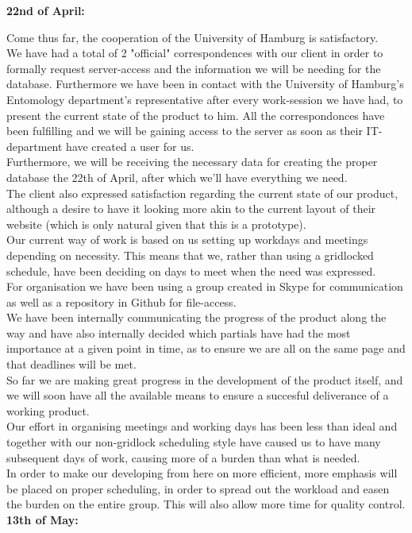 \documentclass[12pt,a4paper]{article}
\begin{document}
{\bf 22nd of April:}

Come thus far, the cooperation of the University of Hamburg is satisfactory.\\
We have had a total of 2 "official" correspondences with our client in order to formally request server-access and the information we will be needing for the database. Furthermore we have been in contact with the University of Hamburg's Entomology department's representative after every work-session we have had, to present the current state of the product to him.
All the correspondonces have been fulfilling and we will be gaining access to the server as soon as their IT-department have created a user for us.\\ Furthermore, we will be receiving the necessary data for creating the proper database the 22th of April, after which we'll have everything we need. \\
The client also expressed satisfaction regarding the current state of our product, although a desire to have it looking more akin to the current layout of their website (which is only natural given that this is a prototype).\\
Our current way of work is based on us setting up workdays and meetings depending on necessity. This means that we, rather than using a gridlocked schedule, have been deciding on days to meet when the need was expressed.\\
For organisation we have been using a group created in Skype for communication as well as a repository in Github for file-access. \\
We have been internally communicating the progress of the product along the way and have also internally decided which partials have had the most importance at a given point in time, as to ensure we are all on the same page and that deadlines will be met.\\

So far we are making great progress in the development of the product itself, and we will soon have all the available means to ensure a succesful deliverance of a working product.\\
Our effort in organising meetings and working days has been less than ideal and together with our non-gridlock scheduling style have caused us to have many subsequent days of work, causing more of a burden than what is needed.\\
In order to make our developing from here on more efficient, more emphasis will be placed on proper scheduling, in order to spread out the workload and easen the burden on the entire group. This will also allow more time for quality control.\\
\newpage
{\bf 13th of May:}
\end{document}
